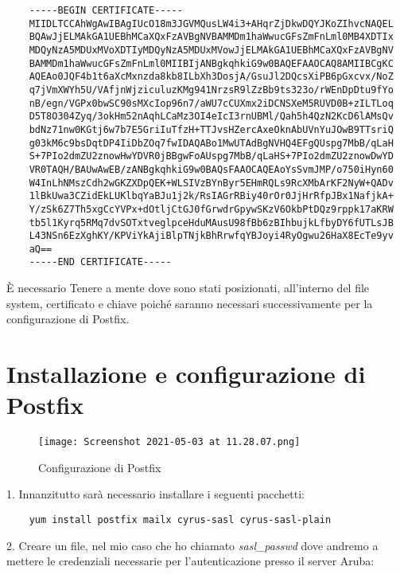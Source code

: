 \begin{verbatim}
    -----BEGIN CERTIFICATE-----
    MIIDLTCCAhWgAwIBAgIUcO18m3JGVMQusLW4i3+AHqrZjDkwDQYJKoZIhvcNAQEL
    BQAwJjELMAkGA1UEBhMCaXQxFzAVBgNVBAMMDm1haWwucGFsZmFnLml0MB4XDTIx
    MDQyNzA5MDUxMVoXDTIyMDQyNzA5MDUxMVowJjELMAkGA1UEBhMCaXQxFzAVBgNV
    BAMMDm1haWwucGFsZmFnLml0MIIBIjANBgkqhkiG9w0BAQEFAAOCAQ8AMIIBCgKC
    AQEAo0JQF4b1t6aXcMxnzda8kb8ILbXh3DosjA/GsuJl2DQcsXiPB6pGxcvx/NoZ
    q7jVmXWYh5U/VAfjnWjziculuzKMg941NrzsR9lZzBb9ts323o/rWEnDpDtu9fYo
    nB/egn/VGPx0bwSC90sMXcIop96n7/aWU7cCUXmx2iDCNSXeM5RUVD0B+zILTLoq
    D5T8O304Zyq/3okHm52nAqhLCaMz3OI4eIcI3rnUBMl/Qah5h4QzN2KcD6lAMsQv
    bdNz71nw0KGtj6w7b7E5GriIuTfzH+TTJvsHZercAxeOknAbUVnYuJOwB9TTsriQ
    g03kM6c9bsDqtDP4IiDbZOq7fwIDAQABo1MwUTAdBgNVHQ4EFgQUspg7MbB/qLaH
    S+7PIo2dmZU2znowHwYDVR0jBBgwFoAUspg7MbB/qLaHS+7PIo2dmZU2znowDwYD
    VR0TAQH/BAUwAwEB/zANBgkqhkiG9w0BAQsFAAOCAQEAoYsSvmJMP/o750iHyn60
    W4InLhNMszCdh2wGKZXDpQEK+WLSIVzBYnByr5EHmRQLs9RcXMbArKF2NyW+QADv
    1lBkUwa3CZidEkLUKlbqYaBJu1j2k/RsIAGrRBiy40rOr0JjHrRfpJBx1NafjkA+
    Y/zSk6Z7Th5xgCcYVPx+dOtljCtGJ0fGrwdrGpywSKzV6OkbPtDQz9rppk17aKRW
    tb5l1Kyrq5RMq7dvSOTxtveglpceHduMAusU98fBb6zBIhbujkLfbyDY6fUTLsJB
    L43NSn6EzXghKY/KPViYkAjiBlpTNjkBhRrwfqYBJoyi4RyOgwu26HaX8EcTe9yv
    aQ==
    -----END CERTIFICATE-----

\end{verbatim}

È necessario Tenere a mente dove sono stati posizionati, all’interno del file system, 
certificato e chiave poiché saranno necessari successivamente per la configurazione di Postfix.

\section{Installazione e configurazione di Postfix}

\begin{figure}[htp]
    \centering
    \texttt{[image: Screenshot 2021-05-03 at 11.28.07.png]}
    \caption{Configurazione di Postfix}\label{confPostfix}
  \end{figure}

1. Innanzitutto sarà necessario installare i seguenti pacchetti:

\begin{verbatim}
    yum install postfix mailx cyrus-sasl cyrus-sasl-plain
\end{verbatim}
2. Creare un file, nel mio caso che ho chiamato \textit{sasl\_passwd} dove andremo a mettere le credenziali
necessarie per l'autenticazione presso il server Aruba:

